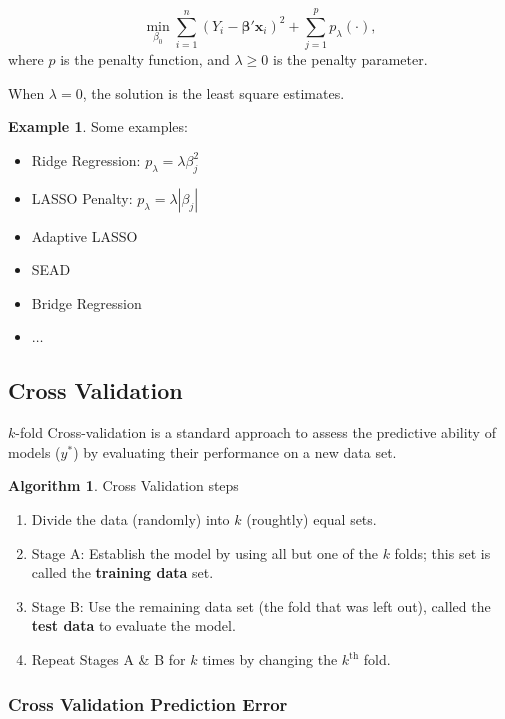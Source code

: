 \documentclass[11pt]{article}
\newcommand\VEC{\bm}{}
\theoremstyle{definition}
\newtheorem{example}{Example}[section]
\newtheorem{algorithm}{Algorithm}[section]
\numberwithin{equation}{section}
\begin{document}
\begin{equation}
  \min_{\beta_0}\sum^n_{i=1}(Y_i - \VEC{\beta}'\VEC{x}_i)^2 + \sum^p_{j=1}p_\lambda(\cdot),
\end{equation}
where $p$ is the penalty function, and $\lambda\geq 0$ is the penalty parameter.

When $\lambda=0$, the solution is the least square estimates.

\begin{example}
  Some examples:
  \begin{itemize}
    \item Ridge Regression: $p_\lambda = \lambda\beta_j^2$
    \item LASSO Penalty: $p_\lambda = \lambda |\beta_j|$
    \item Adaptive LASSO
    \item SEAD
    \item Bridge Regression
    \item $\dots$
  \end{itemize}
\end{example}

\subsection{Cross Validation}

$k$-fold Cross-validation is a standard approach to assess the predictive ability of models ($y^*$) by evaluating their performance on a new data set.

\begin{algorithm}
Cross Validation steps
  \begin{enumerate}
    \item Divide the data (randomly) into $k$ (roughtly) equal sets.
    \item Stage A: Establish the model by using all but one of the $k$ folds; this set is called the \textbf{training data} set.
    \item Stage B: Use the remaining data set (the fold that was left out), called the \textbf{test data} to evaluate the model.
    \item Repeat Stages A \& B for $k$ times by changing the $k^\text{th}$ fold.
  \end{enumerate}
\end{algorithm}

\subsubsection{Cross Validation Prediction Error}
\end{document}
